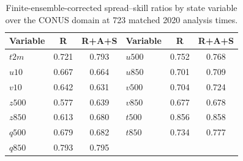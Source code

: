 \begin{table}[!htbp]
    \centering
    \caption{Finite-ensemble-corrected spread--skill ratios by state variable
    over the CONUS domain at 723 matched 2020 analysis times.}
    \label{tab:frozen2019_spread_skill_variable}
    \small
    \renewcommand{\arraystretch}{1.08}
    \begin{tabular*}{\textwidth}{@{\extracolsep{\fill}}lcclcc@{}}
        \toprule
        Variable & R & R+A+S & Variable & R & R+A+S \\
        \midrule
        $t2m$  & 0.721 & 0.793 & $u500$ & 0.752 & 0.768 \\
        $u10$  & 0.667 & 0.664 & $u850$ & 0.701 & 0.709 \\
        $v10$  & 0.642 & 0.631 & $v500$ & 0.704 & 0.724 \\
        $z500$ & 0.577 & 0.639 & $v850$ & 0.677 & 0.678 \\
        $z850$ & 0.613 & 0.680 & $t500$ & 0.856 & 0.858 \\
        $q500$ & 0.679 & 0.682 & $t850$ & 0.734 & 0.777 \\
        $q850$ & 0.793 & 0.795 & & & \\
        \bottomrule
    \end{tabular*}
\end{table}